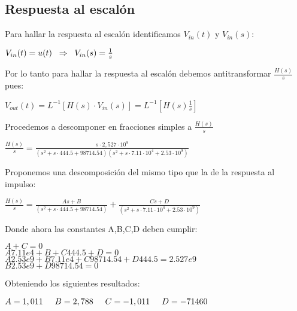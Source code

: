 \documentclass[12pt, titlepage]{article}
\begin{document}
    \newpage
    
    \subsection{Respuesta al escalón}
     Para hallar la respuesta al escalón identificamos $V_{in}(t)$ y $V_{in}(s)$:
    \begin{center}
        $V_{in}(t) = u(t) \hspace{2mm} \Rightarrow  \hspace{2mm} V_{in}(s) = \frac{1}{s}$
    \end{center}
    
    Por lo tanto para hallar la respuesta al escalón debemos antitransformar $\frac{H(s)}{s}$ pues:
    \begin{center}
        $V_{out}(t) = L^{-1}[H(s) \cdot V_{in}(s)] = L^{-1}[H(s) \frac{1}{s}]$
    \end{center}
    
    Procedemos a descomponer en fracciones simples a $\frac{H(s)}{s}$
    \begin{center}
         $\frac{H(s)}{s} = \frac{s \cdot 2,527 \cdot 10^9}{(s^2+ s \cdot 444.5 + 98714.54)(s^2 +s \cdot 7.11\cdot 10^{4} + 2.53\cdot10^{9})} $
    \end{center}
    
    Proponemos una descomposición del mismo tipo que la de la respuesta al impulso:
    
     \begin{center}
               $\frac{H(s)}{s} = \frac{A s + B}{(s^2+ s \cdot 444.5 + 98714.54)} +  \frac{Cs + D}{(s^2 +s \cdot 7.11\cdot 10^{4} + 2.53\cdot10^{9})}$
    \end{center}
    
    Donde ahora las constantes A,B,C,D deben cumplir: 
    
    \begin{center}
    $A+C = 0$\\
    $A7.11e4 +B+C444.5+D = 0$\\
    $A2.53e9 + B7.11e4+ C98714.54 +D444.5 = 2.527e9$\\
    $B2.53e9 + D98714.54 = 0$
    \end{center}
    
    Obteniendo los siguientes resultados:
    \begin{center}
       $A=1,011 \hspace{5mm} B=2,788 \hspace{5mm} C=-1,011 \hspace{5mm} D=-71460$
    \end{center}
    
\end{document}
